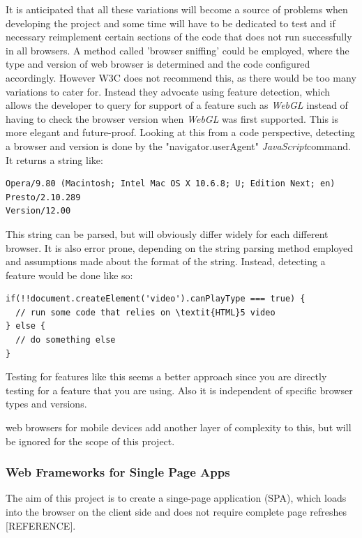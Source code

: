 \documentclass[a4paper,11pt,twoside]{article}
\begin{document}
It is anticipated that all these variations will become a source of problems when developing the project and some time will have to be dedicated to test and if necessary reimplement certain sections of the code that does not run successfully in all browsers. A method called 'browser sniffing' could be employed, where the type and version of web browser is determined and the code configured accordingly. However W3C does not recommend this, as there would be too many variations to cater for. Instead they advocate using feature detection, which allows the developer to query for support of a feature such as \textit{WebGL} instead of having to check the browser version when \textit{WebGL} was first supported. This is more elegant and future-proof. 
Looking at this from a code perspective, detecting a browser and version is done by the "navigator.userAgent" \textit{JavaScript}command. It returns a string like:

\begin{verbatim}
Opera/9.80 (Macintosh; Intel Mac OS X 10.6.8; U; Edition Next; en) Presto/2.10.289 
Version/12.00
\end{verbatim}

This string can be parsed, but will obviously differ widely for each different browser. It is also error prone, depending on the string parsing method employed and assumptions made about the format of the string. Instead, detecting a feature would be done like so:
\begin{verbatim}
if(!!document.createElement('video').canPlayType === true) {
  // run some code that relies on \textit{HTML}5 video
} else {
  // do something else
}
\end{verbatim}

Testing for features like this seems a better approach since you are directly testing for a feature that you are using. Also it is independent of specific browser types and versions.

web browsers for mobile devices add another layer of complexity to this, but will be ignored for the scope of this project.




\subsubsection{Web Frameworks for Single Page Apps}

The aim of this project is to create a singe-page application (SPA), which loads into the browser on the client side and does not require complete page refreshes [REFERENCE].
\end{document}
